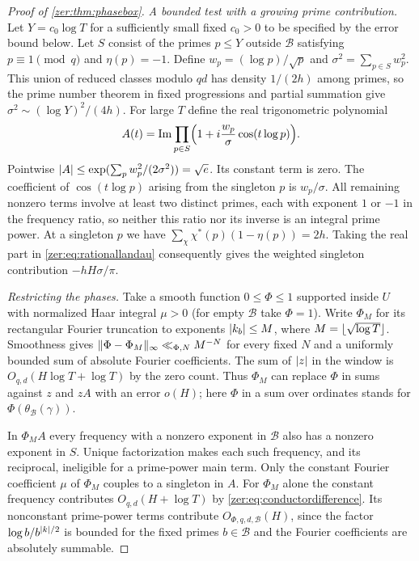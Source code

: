 \begin{proof}[Proof of \cref{zer:thm:phasebox}]
\emph{A bounded test with a growing prime contribution.} Let $Y=c_0\log T$ for a
sufficiently small fixed $c_0>0$ to be specified by the error bound below. Let $S$ consist
of the primes $p\le Y$ outside $\mathcal B$ satisfying $p\equiv1\pmod q$ and $\eta(p)=-1$.
Define $w_p=(\log p)/\sqrt p$ and $\sigma^2=\sum_{p\in S}w_p^2$. This union of reduced
classes modulo $qd$ has density $1/(2h)$ among primes, so the prime number theorem in fixed
progressions and partial summation give $\sigma^2\sim(\log Y)^2/(4h)$. For large $T$ define
the real trigonometric polynomial
\[
 A(t)=\Im\prod_{p\in S}\Bigl(1+i\frac{w_p}\sigma\cos(t\log p)\Bigr).
\]
Pointwise $\abs A\le\exp(\sum_pw_p^2/(2\sigma^2))=\sqrt e$. Its constant term is zero. The
coefficient of $\cos(t\log p)$ arising from the singleton $p$ is $w_p/\sigma$. All
remaining nonzero terms involve at least two distinct primes, each with exponent $1$ or
$-1$ in the frequency ratio, so neither this ratio nor its inverse is an integral prime
power. At a singleton $p$ we have $\sum_\chi\chi^*(p)(1-\eta(p))=2h$. Taking the real part
in \eqref{zer:eq:rationallandau} consequently gives the weighted singleton contribution
$-hH\sigma/\pi$.

\emph{Restricting the phases.} Take a smooth function $0\le\Phi\le1$ supported inside $U$
with normalized Haar integral $\mu>0$ (for empty $\mathcal B$ take $\Phi=1$). Write
$\Phi_M$ for its rectangular Fourier truncation to exponents $\abs{k_b}\le M$, where
$M=\floor{\sqrt{\log T}}$. Smoothness gives
$\norm{\Phi-\Phi_M}_\infty\ll_{\Phi,N}M^{-N}$ for every fixed $N$ and a uniformly bounded
sum of absolute Fourier coefficients. The sum of $\abs z$ in the window is
$O_{q,d}(H\log T+\log T)$ by the zero count. Thus $\Phi_M$ can replace $\Phi$ in sums
against $z$ and $zA$ with an error $o(H)$; here $\Phi$ in a sum over ordinates stands for
$\Phi(\theta_{\mathcal B}(\gamma))$.

In $\Phi_MA$ every frequency with a nonzero exponent in $\mathcal B$ also has a nonzero
exponent in $S$. Unique factorization makes each such frequency, and its reciprocal,
ineligible for a prime-power main term. Only the constant Fourier coefficient $\mu$ of
$\Phi_M$ couples to a singleton in $A$. For $\Phi_M$ alone the constant frequency
contributes $O_{q,d}(H+\log T)$ by \eqref{zer:eq:conductordifference}. Its nonconstant
prime-power terms contribute $O_{\Phi,q,d,\mathcal B}(H)$, since the factor
$\log b/b^{\abs k/2}$ is bounded for the fixed primes $b\in\mathcal B$ and the Fourier
coefficients are absolutely summable.


\end{proof}
